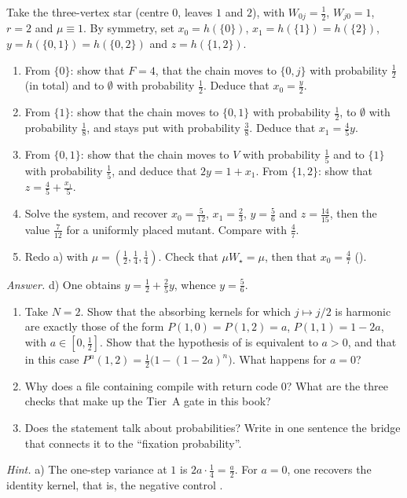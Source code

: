 \begin{exercise}\label{ch4:ex:star}
Take the three-vertex star (centre $0$, leaves $1$ and $2$), with $W_{0j}=\frac12$, $W_{j0}=1$, $r=2$ and
$\mu\equiv1$. By symmetry, set $x_0=h(\{0\})$, $x_1=h(\{1\})=h(\{2\})$, $y=h(\{0,1\})=h(\{0,2\})$ and
$z=h(\{1,2\})$.
\begin{enumerate}[label=\alph*),itemsep=0pt]
\item From $\{0\}$: show that $F=4$, that the chain moves to $\{0,j\}$ with probability $\frac12$ (in total) and to
$\emptyset$ with probability $\frac12$. Deduce that $x_0=\frac y2$.
\item From $\{1\}$: show that the chain moves to $\{0,1\}$ with probability $\frac12$, to $\emptyset$ with
probability $\frac18$, and stays put with probability $\frac38$. Deduce that $x_1=\frac45y$.
\item From $\{0,1\}$: show that the chain moves to $V$ with probability $\frac15$ and to $\{1\}$ with probability
$\frac15$, and deduce that $2y=1+x_1$. From $\{1,2\}$: show that $z=\frac45+\frac{x_1}5$.
\item Solve the system, and recover $x_0=\frac5{12}$, $x_1=\frac23$, $y=\frac56$ and $z=\frac{14}{15}$, then the
value $\frac7{12}$ for a uniformly placed mutant. Compare with $\frac47$.
\item Redo a) with $\mu=(\frac12,\frac14,\frac14)$. Check that $\mu W_\star=\mu$, then that $x_0=\frac47$
().
\end{enumerate}
\emph{Answer.} d) One obtains $y=\frac12+\frac25y$, whence $y=\frac56$.
\end{exercise}

\begin{exercise}
\begin{enumerate}[label=\alph*),itemsep=0pt]
\item Take $N=2$. Show that the absorbing kernels for which $j\mapsto j/2$ is harmonic are
exactly those of the form $P(1,0)=P(1,2)=a$, $P(1,1)=1-2a$, with $a\in[0,\frac12]$. Show that the hypothesis
 of  is equivalent to $a>0$, and that in this case $P^n(1,2)=\frac12\bigl(1-(1-2a)^n\bigr)$.
What happens for $a=0$?
\item Why does a file containing  compile with return code $0$? What are the three
checks that make up the Tier~A gate in this book?
\item Does the statement  talk about probabilities? Write in one sentence the \tierC{} bridge that
connects it to the ``fixation probability''.
\end{enumerate}
\emph{Hint.} a) The one-step variance at $1$ is $2a\cdot\frac14=\frac a2$. For $a=0$, one recovers the
identity kernel, that is, the negative control .
\end{exercise}

